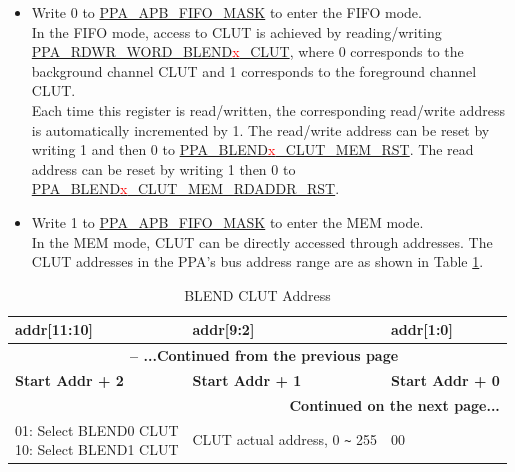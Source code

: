 \documentclass[main\_\_EN.tex]{subfiles}
\begin{document}
\begin{itemize}
    \item Write 0 to \hyperref[fielddesc:PPAAPBFIFOMASK]{PPA\_APB\_FIFO\_MASK} to enter the FIFO mode. \\
    In the FIFO mode, access to CLUT is achieved by reading/writing \hyperref[fielddesc:PPARDWRWORDBLEND0CLUT]{PPA\_RDWR\_WORD\_BLEND\textcolor{red}{x}\_CLUT}, where 0 corresponds to the background channel CLUT and 1 corresponds to the foreground channel CLUT. \\
    Each time this register is read/written, the corresponding read/write address is automatically incremented by 1. The read/write address can be reset by writing 1 and then 0 to \hyperref[fielddesc:PPABLEND0CLUTMEMRST]{PPA\_BLEND\textcolor{red}{x}\_CLUT\_MEM\_RST}. The read address can be reset by writing 1 then 0 to \hyperref[fielddesc:PPABLEND0CLUTMEMRDADDRRST]{PPA\_BLEND\textcolor{red}{x}\_CLUT\_MEM\_RDADDR\_RST}.
    \item Write 1 to \hyperref[fielddesc:PPAAPBFIFOMASK]{PPA\_APB\_FIFO\_MASK} to enter the MEM mode. \\
    In the MEM mode, CLUT can be directly accessed through addresses. The CLUT addresses in the PPA's bus address range are as shown in Table \ref{tab:blend-clut-addr}.
\end{itemize}

\begin{longtable}[c]{ |p{5cm}|p{5cm}|p{2.5cm}| }
    \caption{BLEND CLUT Address}
    \label{tab:blend-clut-addr}\\\hline

    \rowcolor{lightgray}
    \textbf{addr[11:10]} & \textbf{addr[9:2]} & \textbf{addr[1:0]} \\\hline
    \endfirsthead


    \multicolumn{3}{c}{\bfseries \tablename\ \thetable{} -- ...Continued from the previous page}\\\hline
    \rowcolor{lightgray}
    \textbf{Start Addr + 2} & \textbf{Start Addr + 1} & \textbf{Start Addr + 0} \\\hline
    \endhead

    \multicolumn{3}{r}{\textbf{Continued on the next page...}} \\
    \endfoot

    \endlastfoot

        \makecell[l]{01: Select BLEND0 CLUT\\10: Select BLEND1 CLUT} & CLUT actual address, 0 \verb+~+ 255 & 00 \\\hline

\end{longtable}
\end{document}
